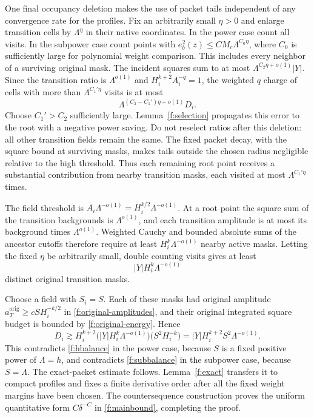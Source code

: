 One final occupancy deletion makes the use of packet tails
independent of any convergence rate for the profiles. Fix an
arbitrarily small $\eta>0$ and enlarge transition cells by
$\Lambda^\eta$ in their native coordinates. In the power case
count all visits. In the subpower case count points with
$e_b^2(z)\le CM_c\Lambda^{C_0\eta}$, where $C_0$ is sufficiently
large for polynomial weight comparison. This includes every
neighbor of a surviving original mask. The incident squares sum
to at most $\Lambda^{C_2\eta+o(1)}|Y|$. Since the transition ratio
is $\Lambda^{o(1)}$ and
$H_i^{k+2}A_i^{-q}=1$, the weighted $q$ charge of cells with more
than $\Lambda^{C_1'\eta}$ visits is at most
\[
 \Lambda^{(C_2-C_1')\eta+o(1)}D_i.
\]
Choose $C_1'>C_2$ sufficiently large. Lemma~\ref{f:selection}
propagates this error to the root with a negative power saving.
Do not reselect ratios after this deletion: all other transition
fields remain the same. The fixed packet decay, with the square
bound at surviving masks, makes tails outside the chosen radius
negligible relative to the high threshold. Thus each remaining
root point receives a substantial contribution from nearby
transition masks, each visited at most
$\Lambda^{C_1'\eta}$ times.

The field threshold is $A_i\Lambda^{-o(1)}=H_i^{k/2}\Lambda^{-o(1)}$.
At a root point the square sum of the transition backgrounds is
$\Lambda^{o(1)}$, and each transition amplitude is at most its
background times $\Lambda^{o(1)}$. Weighted Cauchy and bounded
absolute sums of the ancestor cutoffs therefore require at least
$H_i^k\Lambda^{-o(1)}$ nearby active masks. Letting the fixed
$\eta$ be arbitrarily small, double counting visits gives at least
\[
 |Y|H_i^k\Lambda^{-o(1)}
\]
distinct original transition masks.

Choose a field with $S_i=S$. Each of these masks had original
amplitude $a_T^{\mathrm{orig}}\ge cSH_i^{-k/2}$ in
\eqref{f:original-amplitudes}, and their original integrated square
budget is bounded by \eqref{f:original-energy}. Hence
\[
 D_i\gtrsim H_i^{k+2}
       \big(|Y|H_i^k\Lambda^{-o(1)}\big)
       \big(S^2H_i^{-k}\big)
 =|Y|H_i^{k+2}S^2\Lambda^{-o(1)}.
\]
This contradicts \eqref{f:hbalance} in the power case, because
$S$ is a fixed positive power of $\Lambda=h$, and contradicts
\eqref{f:subbalance} in the subpower case, because $S=\Lambda$.
The exact-packet estimate follows. Lemma~\ref{f:exact} transfers it
to compact profiles and fixes a finite derivative order after all
the fixed weight margins have been chosen. The countersequence
construction proves the uniform quantitative form
$C\delta^{-C}$ in \eqref{f:mainbound}, completing the proof.
